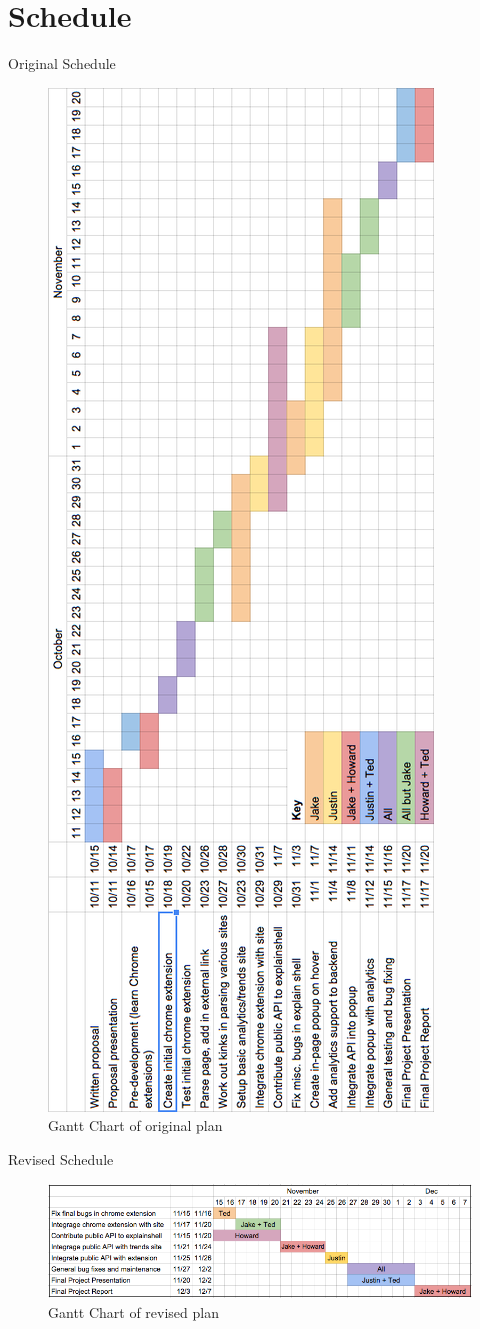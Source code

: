 \documentclass[xcolor=dvipsnames]{beamer}
\begin{document}
\section{Schedule}\label{schedule}
\begin{frame}{Original Schedule}
\begin{figure}[h]
  \vspace*{-2em}
  \includegraphics[width=.38\textwidth, angle=-90]{gantt-chart-rotated.png}
  \caption{\small Gantt Chart of original plan\label{gantt-chart-org}}
\end{figure}
\end{frame}

\begin{frame}{Revised Schedule}
\begin{figure}[h]
  \includegraphics[width=\textwidth]{gantt-chart-revised-only.png}
  \caption{\small Gantt Chart of revised plan\label{gantt-chart-rev}}
\end{figure}
\end{frame}
\end{document}
